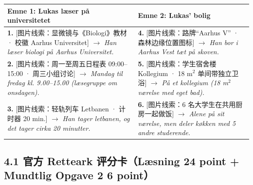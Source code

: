 \begin{tcolorbox}[enhanced, breakable, colback=NCDBgGray, colframe=NCDTeal, coltitle=white, fonttitle=\bfseries, title={Kursist B Ark --- Case: Lukas（回答方线索卡 · 供 B 看图回答）}, arc=2pt, boxrule=0.8pt, left=10pt, right=10pt, top=7pt, bottom=7pt]
\small
\renewcommand{\arraystretch}{1.35}
\begin{tabularx}{\linewidth}{@{} >{\raggedright\arraybackslash}p{8.0cm} >{\raggedright\arraybackslash}X @{}}
\toprule
\textbf{\color{NCDTeal}Emne 1: Lukas læser på universitetet} & \textbf{\color{NCDTeal}Emne 2: Lukas’ bolig} \\
\midrule
\textbf{1.} [图片线索：显微镜与《Biologi》教材 · 校徽 Aarhus Universitet]\newline
$\rightarrow$ \textit{Han læser biologi på Aarhus Universitet.}
&
\textbf{4.} [图片线索：路牌“Aarhus V” · 森林边缘位置图标]\newline
$\rightarrow$ \textit{Han bor i Aarhus Vest tæt på skoven.}
\\
\midrule
\textbf{2.} [图片线索：周一至周五日程表 09:00--15:00 · 周三小组讨论]\newline
$\rightarrow$ \textit{Mandag til fredag kl. 9.00--15.00 (læsegruppe om onsdagen).}
&
\textbf{5.} [图片线索：学生宿舍楼 Kollegium · 18 m$^2$ 单间带独立卫浴]\newline
$\rightarrow$ \textit{På et kollegium (18 m$^2$ værelse med eget bad).}
\\
\midrule
\textbf{3.} [图片线索：轻轨列车 Letbanen · 计时器 20 min.]\newline
$\rightarrow$ \textit{Han tager letbanen, og det tager cirka 20 minutter.}
&
\textbf{6.} [图片线索：6 名大学生在共用厨房一起做饭]\newline
$\rightarrow$ \textit{Alene på sit værelse, men deler køkken med 5 andre studerende.}
\\
\bottomrule
\end{tabularx}
\end{tcolorbox}


\subsection*{4.1 官方 Retteark 评分卡（Læsning 24 point + Mundtlig Opgave 2 6 point）}

